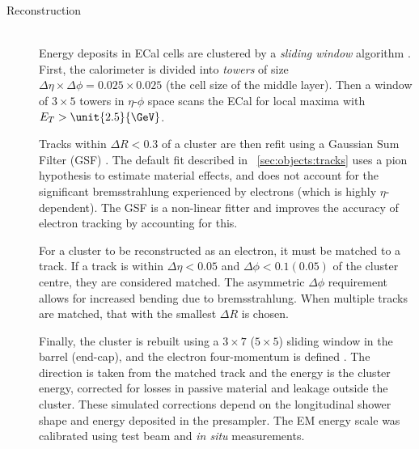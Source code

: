 \begin{description}
\item[Reconstruction] \hfill \\
	Energy deposits in \ac{ECal} cells are clustered by a \textit{sliding window} 
	algorithm \cite{ElectronPerf:Expect}. First, the calorimeter is divided into 
	\textit{towers} of size $\Delta\eta \times \Delta\phi = 0.025 \times 0.025$ (the 
	cell size of the middle layer). Then a window of $3 \times 5$ towers in $\eta$-$\phi$ 
	space scans the \ac{ECal} for local maxima with $E_T > \unit{2.5}{\GeV}$.

	Tracks within $\Delta R < 0.3$ of a cluster are then refit using a Gaussian Sum 
	Filter (GSF) \cite{Electron:GSF}. The default fit described in 
	\Section~\ref{sec:objects:tracks} uses a pion hypothesis to estimate material 
	effects, and does not account for the significant bremsstrahlung experienced by 
	electrons (which is highly $\eta$-dependent). The GSF is a non-linear fitter and 
	improves the accuracy of electron tracking by accounting for this.

	For a cluster to be reconstructed as an electron, it must be matched to a track. If a 
	track is within $\Delta\eta < 0.05$ and $\Delta\phi < 0.1 (0.05)$ of the cluster 
	centre, they are considered matched. The asymmetric $\Delta\phi$ requirement allows 
	for increased bending due to bremsstrahlung. When multiple tracks are matched, that 
	with the smallest $\Delta R$ is chosen.

	Finally, the cluster is rebuilt using a $3 \times 7$ ($5 \times 5$) sliding window 
	in the barrel (end-cap), and the electron four-momentum is defined 
	\cite{ElectronPerf:2010}. The direction is taken from the matched track and the 
	energy is the cluster energy, corrected for losses in passive material and leakage 
	outside the cluster. These simulated corrections depend on the longitudinal shower 
	shape and energy deposited in the presampler. The EM energy scale was calibrated
	using test beam and \textit{in situ} \HepProcess{\PZ \HepTo \Pe\Pe} measurements.


\end{description}

